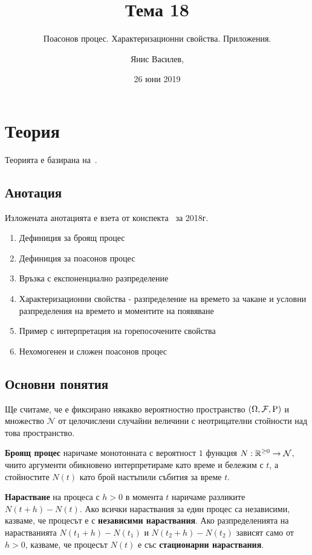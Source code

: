 \documentclass[numbers=endperiod, bibliography=totocnumbered]{scrartcl}
\title{Тема 18}
\subtitle{Поасонов процес. Характеризационни свойства. Приложения.}
\author{Янис Василев, \Email{ianis@ivasilev.net}}
\date{26 юни 2019}
\begin{document}
\maketitle

\section{Теория}

Теорията е базирана на~\cite{Lectures}.

\subsection{Анотация}

Изложената анотацията е взета от конспекта~\cite{Syllabus} за 2018г.

\begin{enumerate}
  \item Дефиниция за броящ процес
  \item Дефиниция за поасонов процес
  \item Връзка с експоненциално разпределение
  \item Характеризационни свойства - разпределение на времето за чакане и условни разпределения на времето и моментите на появяване
  \item Пример с интерпретация на горепосочените свойства
  \item Нехомогенен и сложен поасонов процес
\end{enumerate}

\subsection{Основни понятия}

Ще считаме, че е фиксирано някакво вероятностно пространство \( (\Omega, \mathcal{F}, \operatorname{P}) \) и множество \( \mathcal{N} \) от целочислени случайни величини с неотрицателни стойности над това пространство.

\begin{definition}
  \textbf{Броящ процес} наричаме монотонната с вероятност \( 1 \) функция \( N: \mathbb{R}^{\geq 0} \to \mathcal{N} \), чиито аргументи обикновено интерпретираме като време и бележим с \( t \), а стойностите \( N(t) \) като брой настъпили събития за време \( t \).

  \textbf{Нарастване} на процеса с \( h > 0 \) в момента \( t \) наричаме разликите \( N(t+h) - N(t) \). Ако всички нараствания за един процес са независими, казваме, че процесът е с \textbf{независими нараствания}. Ако разпределенията на нарастванията \( N(t_1+h) - N(t_1) \) и \( N(t_2+h) - N(t_2) \) зависят само от \( h>0 \), казваме, че процесът \( N(t) \) е със \textbf{стационарни нараствания}.
\end{definition}
\end{document}
